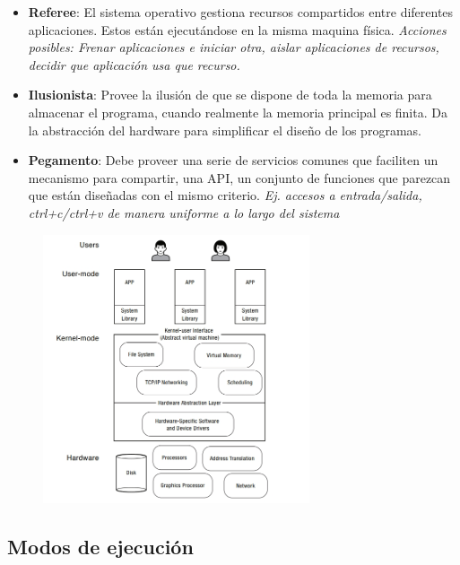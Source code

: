 \documentclass[titlepage,a4paper]{article}
\begin{document}
\begin{itemize}
    \item \textbf{Referee}: El sistema operativo gestiona recursos compartidos entre diferentes aplicaciones. Estos están ejecutándose en la misma maquina física. \textit{Acciones posibles: Frenar aplicaciones e iniciar otra, aislar aplicaciones de recursos, decidir que aplicación usa que recurso.}
    \item \textbf{Ilusionista}: Provee la ilusión de que se dispone de toda la memoria para almacenar el programa, cuando realmente la memoria principal es finita. Da la abstracción del hardware para simplificar el diseño de los programas.
    \item \textbf{Pegamento}: Debe proveer una serie de servicios comunes que faciliten un mecanismo para compartir, una API, un conjunto de funciones que parezcan que están diseñadas con el mismo criterio. \textit{Ej. accesos a entrada/salida, ctrl+c/ctrl+v de manera uniforme a lo largo del sistema}
\end{itemize}

\begin{figure}[!htb]
    \centering
    \includegraphics[width=0.7\textwidth]{ImagenesApunte/SystemaOperativoCapas.jpg}
\end{figure}


\subsection*{Modos de ejecución}
\end{document}
